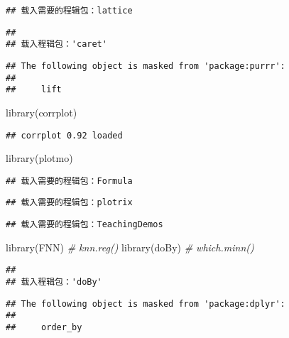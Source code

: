 \documentclass[
]{article}
\newenvironment{Shaded}{\begin{snugshade}}{\end{snugshade}}
\newcommand{\CommentTok}[1]{\textcolor[rgb]{0.56,0.35,0.01}{\textit{#1}}}
\newcommand{\FunctionTok}[1]{\textcolor[rgb]{0.00,0.00,0.00}{#1}}
\newcommand{\NormalTok}[1]{#1}
\begin{document}
\begin{verbatim}
## 载入需要的程辑包：lattice
\end{verbatim}

\begin{verbatim}
## 
## 载入程辑包：'caret'
\end{verbatim}

\begin{verbatim}
## The following object is masked from 'package:purrr':
## 
##     lift
\end{verbatim}

\begin{Shaded}
\begin{Highlighting}[]
\FunctionTok{library}\NormalTok{(corrplot)}
\end{Highlighting}
\end{Shaded}

\begin{verbatim}
## corrplot 0.92 loaded
\end{verbatim}

\begin{Shaded}
\begin{Highlighting}[]
\FunctionTok{library}\NormalTok{(plotmo)}
\end{Highlighting}
\end{Shaded}

\begin{verbatim}
## 载入需要的程辑包：Formula
\end{verbatim}

\begin{verbatim}
## 载入需要的程辑包：plotrix
\end{verbatim}

\begin{verbatim}
## 载入需要的程辑包：TeachingDemos
\end{verbatim}

\begin{Shaded}
\begin{Highlighting}[]
\FunctionTok{library}\NormalTok{(FNN) }\CommentTok{\# knn.reg()}
\FunctionTok{library}\NormalTok{(doBy) }\CommentTok{\# which.minn()}
\end{Highlighting}
\end{Shaded}

\begin{verbatim}
## 
## 载入程辑包：'doBy'
\end{verbatim}

\begin{verbatim}
## The following object is masked from 'package:dplyr':
## 
##     order_by
\end{verbatim}
\end{document}
